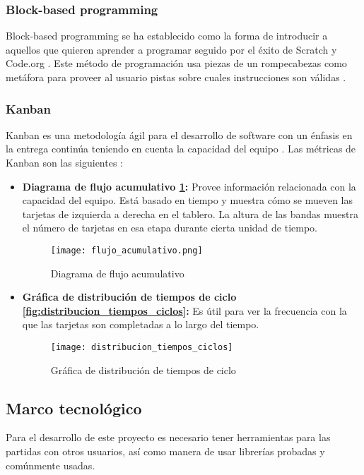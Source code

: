 \subsubsection{Block-based programming}
Block-based programming se ha establecido como la forma de introducir a aquellos que quieren aprender a 
programar seguido por el éxito de Scratch y Code.org \cite{block_based_programming}. 
Este método de programación usa piezas de un rompecabezas como metáfora para proveer al usuario pistas sobre cuales instrucciones son válidas \cite{block_based_programming}. 

\subsubsection{Kanban}
Kanban es una metodología ágil para el desarrollo de software con un énfasis 
en la entrega continúa teniendo en cuenta la capacidad del equipo \cite{romano-a}. 
Las métricas de Kanban son las siguientes \cite{najera2018a}:
\begin{itemize}
    \item \textbf{Diagrama de flujo acumulativo \ref{fig:flujo_acumulativo}:} Provee información relacionada con la capacidad del equipo. Está basado en tiempo y muestra cómo se mueven las tarjetas de izquierda a derecha en el tablero. La altura de las bandas muestra el número de tarjetas en esa etapa durante cierta unidad de tiempo.
    \begin{figure}[h]
        \caption{Diagrama de flujo acumulativo}
        \centering
        \texttt{[image: flujo\_acumulativo.png]}
        \label{fig:flujo_acumulativo}
    \end{figure}
    \item \textbf{Gráfica de distribución de tiempos de ciclo \ref{fig:distribucion_tiempos_ciclos}:} Es útil para ver la frecuencia con la que las tarjetas son completadas a lo largo del tiempo.
    \begin{figure}[h]
        \caption{Gráfica de distribución de tiempos de ciclo}
        \centering
        \texttt{[image: distribucion\_tiempos\_ciclos]}
    \end{figure}
\end{itemize}

\subsection{Marco tecnológico}
Para el desarrollo de este proyecto es necesario tener herramientas para las partidas con otros usuarios, así como manera de usar librerías probadas y comúnmente usadas.

